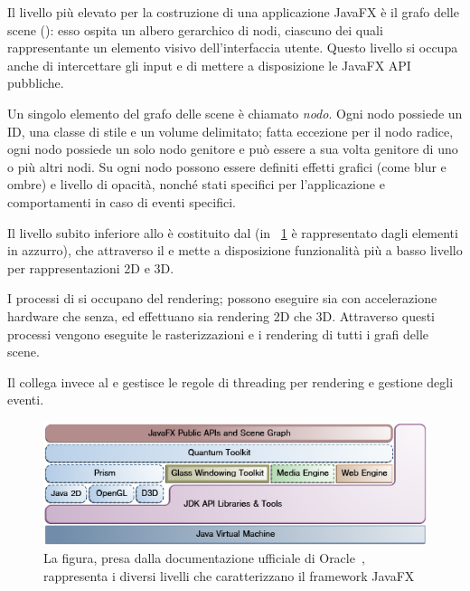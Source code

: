             Il livello più elevato per la costruzione di una applicazione JavaFX è il grafo delle scene (): esso ospita un albero gerarchico di nodi, ciascuno dei quali rappresentante un elemento visivo dell'interfaccia utente. Questo livello si occupa anche di intercettare gli input e di mettere a disposizione le JavaFX API pubbliche.

            Un singolo elemento del grafo delle scene è chiamato \emph{nodo}. Ogni nodo possiede un ID, una classe di stile e un volume delimitato; fatta eccezione per il nodo radice, ogni nodo possiede un solo nodo genitore e può essere a sua volta genitore di uno o più altri nodi. Su ogni nodo possono essere definiti effetti grafici (come blur e ombre) e livello di opacità, nonché stati specifici per l'applicazione e comportamenti in caso di eventi specifici.

            Il livello subito inferiore allo  è costituito dal  (in \figurename~\ref{fig:jfxArch} è rappresentato dagli elementi in azzurro), che attraverso il  e  mette a disposizione funzionalità più a basso livello per rappresentazioni 2D e 3D.

            I processi di  si occupano del rendering; possono eseguire sia con accelerazione hardware che senza, ed effettuano sia rendering 2D che 3D.
            Attraverso questi processi vengono eseguite le rasterizzazioni e i rendering di tutti i grafi delle scene.

            Il  collega invece  al  e gestisce le regole di threading per rendering e gestione degli eventi.

            \begin{figure}[htbp]\label{fig:jfxArch}
                \centering
                \includegraphics[scale=0.75]{img/jfxArch}
                \caption{La figura, presa dalla documentazione ufficiale di Oracle~\cite{java8}, rappresenta i diversi livelli che caratterizzano il framework JavaFX}
            \end{figure}

